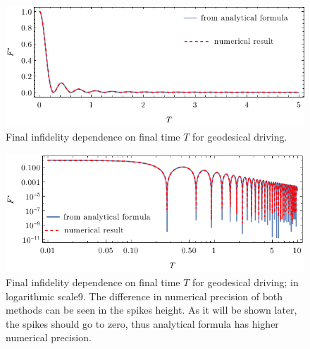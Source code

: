\vspace{-10pt}\begin{figure}[H]
    \centering
    \includegraphics[scale=1.2]{../img/infidelityTfPlot.pdf}
    \caption{Final infidelity dependence on final time $T$ for geodesical driving.}
    \label{fig:infidelityTfPlot}
\end{figure}

\begin{figure}[H]
    \centering
    \includegraphics[scale=1.2]{../img/infidelityTfPlotLog.pdf}
    \caption{Final infidelity dependence on final time $T$ for geodesical driving; in logarithmic scale9. The difference in numerical precision of both methods can be seen in the spikes height. As it will be shown later, the spikes should go to zero, thus analytical formula has higher numerical precision.}
    \label{fig:infidelityTfPlotLog}
\end{figure}



